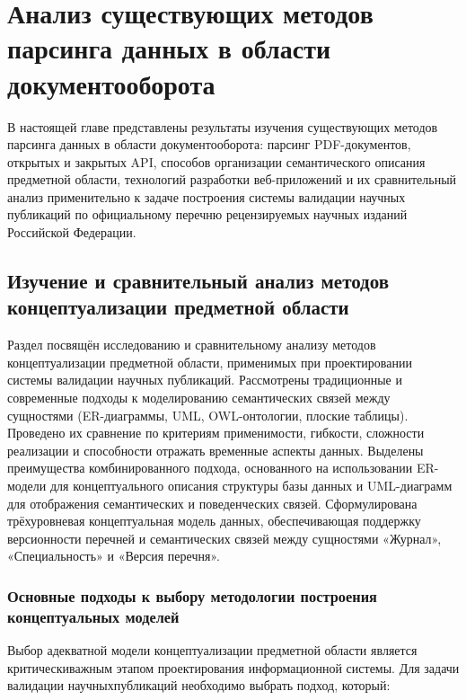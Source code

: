\chapter{Анализ существующих методов парсинга данных в области документооборота}
\label{chapter1}

В настоящей главе представлены результаты изучения существующих 
методов парсинга данных в области документооборота: парсинг PDF-документов,
открытых и закрытых API, способов организации семантического описания предметной области, 
технологий разработки веб-приложений и их сравнительный анализ применительно
к задаче построения системы валидации научных публикаций по официальному перечню
рецензируемых научных изданий Российской Федерации.

\section{Изучение и сравнительный анализ методов концептуализации предметной области}

\nocite{cognitive-systems-research}

\begin{annotation}
	Раздел посвящён исследованию и сравнительному анализу методов концептуализации 
	предметной области, применимых при проектировании системы валидации научных публикаций. 
	Рассмотрены традиционные и современные подходы к моделированию
    семантических связей между сущностями (ER-диаграммы, UML, OWL-онтологии, плоские
	таблицы). Проведено их сравнение по критериям применимости, гибкости, сложности реализации 
	и способности отражать временные аспекты данных. Выделены преимущества
	комбинированного подхода, основанного на использовании ER-модели для концептуального
	описания структуры базы данных и UML-диаграмм для отображения семантических и поведенческих связей. 
	Сформулирована трёхуровневая концептуальная модель данных, обеспечивающая 
	поддержку версионности перечней и семантических связей между сущностями «Журнал», «Специальность» и «Версия перечня».
\end{annotation}


\subsection{Основные подходы к выбору методологии построения концептуальных моделей}

Выбор адекватной модели концептуализации предметной области
является критическиважным этапом проектирования информационной системы.
Для задачи валидации научныхпубликаций необходимо выбрать подход, который:

